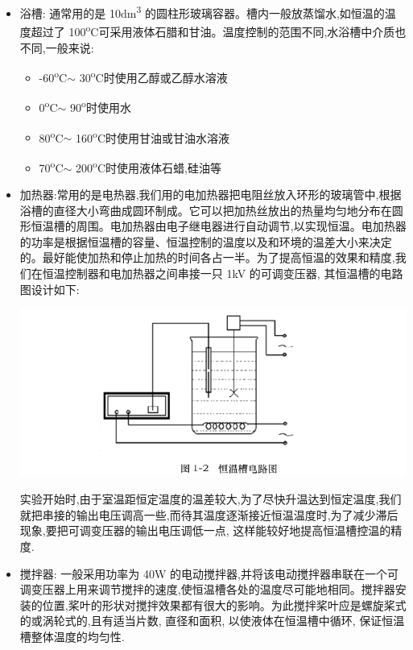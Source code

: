 \documentclass[11pt]{report}
\begin{document}
\begin{itemize}
\item 浴槽: 通常用的是 10dm\textsuperscript{3} 的圆柱形玻璃容器。槽内一般放蒸馏水,如恒温的温度超过了 100\textsuperscript{o}C可采用液体石腊和甘油。温度控制的范围不同,水浴槽中介质也不同,一般来说:
\begin{itemize}
\item -60\textsuperscript{o}C\(\sim\) 30\textsuperscript{o}C时使用乙醇或乙醇水溶液
\item 0\textsuperscript{o}C\(\sim\) 90\textsuperscript{o}时使用水
\item 80\textsuperscript{o}C\(\sim\) 160\textsuperscript{o}C时使用甘油或甘油水溶液
\item 70\textsuperscript{o}C\(\sim\) 200\textsuperscript{o}C时使用液体石蜡,硅油等
\end{itemize}
\item 加热器:常用的是电热器,我们用的电加热器把电阻丝放入环形的玻璃管中,根据浴槽的直径大小弯曲成圆环制成。它可以把加热丝放出的热量均匀地分布在圆形恒温槽的周围。电加热器由电子继电器进行自动调节,以实现恒温。电加热器的功率是根据恒温槽的容量、恒温控制的温度以及和环境的温差大小来决定的。最好能使加热和停止加热的时间各占一半。为了提高恒温的效果和精度,我们在恒温控制器和电加热器之间串接一只 1kV 的可调变压器, 其恒温槽的电路图设计如下:
\begin{center}
\includegraphics[width=.9\linewidth]{../img/2.png}
\end{center}实验开始时,由于室温距恒定温度的温差较大,为了尽快升温达到恒定温度,我们就把串接的输出电压调高一些,而待其温度逐渐接近恒温温度时,为了减少滞后现象,要把可调变压器的输出电压调低一点, 这样能较好地提高恒温槽控温的精度.

\item 搅拌器: 一般采用功率为 40W 的电动搅拌器,并将该电动搅拌器串联在一个可调变压器上用来调节搅拌的速度,使恒温槽各处的温度尽可能地相同。搅拌器安装的位置,桨叶的形状对搅拌效果都有很大的影响。为此搅拌桨叶应是螺旋桨式的或涡轮式的,且有适当片数, 直径和面积, 以使液体在恒温槽中循环, 保证恒温槽整体温度的均匀性.


\end{itemize}
\end{document}
